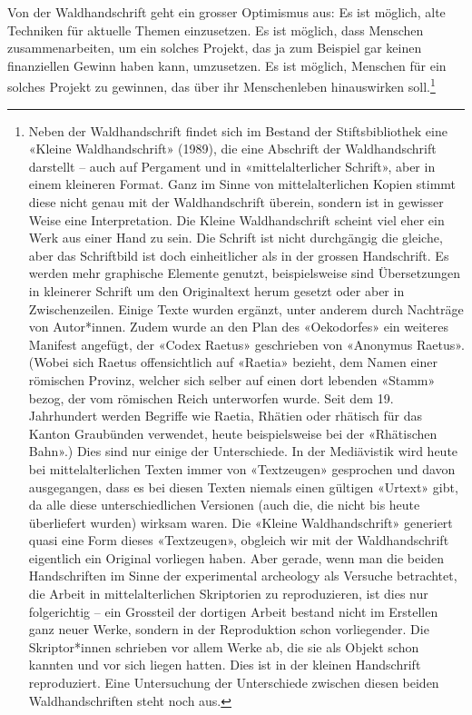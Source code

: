 \documentclass[a4paper,
fontsize=11pt,
oneside,
numbers=noperiodatend,
parskip=half-,
bibliography=totoc,
final
]{scrartcl}
\begin{document}
Von der Waldhandschrift geht ein grosser Optimismus aus: Es ist möglich,
alte Techniken für aktuelle Themen einzusetzen. Es ist möglich, dass
Menschen zusammenarbeiten, um ein solches Projekt, das ja zum Beispiel
gar keinen finanziellen Gewinn haben kann, umzusetzen. Es ist möglich,
Menschen für ein solches Projekt zu gewinnen, das über ihr Menschenleben
hinauswirken soll.\footnote{Neben der Waldhandschrift findet sich im
  Bestand der Stiftsbibliothek eine «Kleine Waldhandschrift» (1989), die
  eine Abschrift der Waldhandschrift darstellt -- auch auf Pergament und
  in «mittelalterlicher Schrift», aber in einem kleineren Format. Ganz
  im Sinne von mittelalterlichen Kopien stimmt diese nicht genau mit der
  Waldhandschrift überein, sondern ist in gewisser Weise eine
  Interpretation. Die Kleine Waldhandschrift scheint viel eher ein Werk
  aus einer Hand zu sein. Die Schrift ist nicht durchgängig die gleiche,
  aber das Schriftbild ist doch einheitlicher als in der grossen
  Handschrift. Es werden mehr graphische Elemente genutzt,
  beispielsweise sind Übersetzungen in kleinerer Schrift um den
  Originaltext herum gesetzt oder aber in Zwischenzeilen. Einige Texte
  wurden ergänzt, unter anderem durch Nachträge von Autor*innen. Zudem
  wurde an den Plan des «Oekodorfes» ein weiteres Manifest angefügt, der
  «Codex Raetus» geschrieben von «Anonymus Raetus». (Wobei sich Raetus
  offensichtlich auf «Raetia» bezieht, dem Namen einer römischen
  Provinz, welcher sich selber auf einen dort lebenden «Stamm» bezog,
  der vom römischen Reich unterworfen wurde. Seit dem 19. Jahrhundert
  werden Begriffe wie Raetia, Rhätien oder rhätisch für das Kanton
  Graubünden verwendet, heute beispielsweise bei der «Rhätischen Bahn».)
  Dies sind nur einige der Unterschiede. In der Mediävistik wird heute
  bei mittelalterlichen Texten immer von «Textzeugen» gesprochen und
  davon ausgegangen, dass es bei diesen Texten niemals einen gültigen
  «Urtext» gibt, da alle diese unterschiedlichen Versionen (auch die,
  die nicht bis heute überliefert wurden) wirksam waren. Die «Kleine
  Waldhandschrift» generiert quasi eine Form dieses «Textzeugen»,
  obgleich wir mit der Waldhandschrift eigentlich ein Original vorliegen
  haben. Aber gerade, wenn man die beiden Handschriften im Sinne der
  experimental archeology als Versuche betrachtet, die Arbeit in
  mittelalterlichen Skriptorien zu reproduzieren, ist dies nur
  folgerichtig -- ein Grossteil der dortigen Arbeit bestand nicht im
  Erstellen ganz neuer Werke, sondern in der Reproduktion schon
  vorliegender. Die Skriptor*innen schrieben vor allem Werke ab, die sie
  als Objekt schon kannten und vor sich liegen hatten. Dies ist in der
  kleinen Handschrift reproduziert. Eine Untersuchung der Unterschiede
  zwischen diesen beiden Waldhandschriften steht noch aus.}
\end{document}

